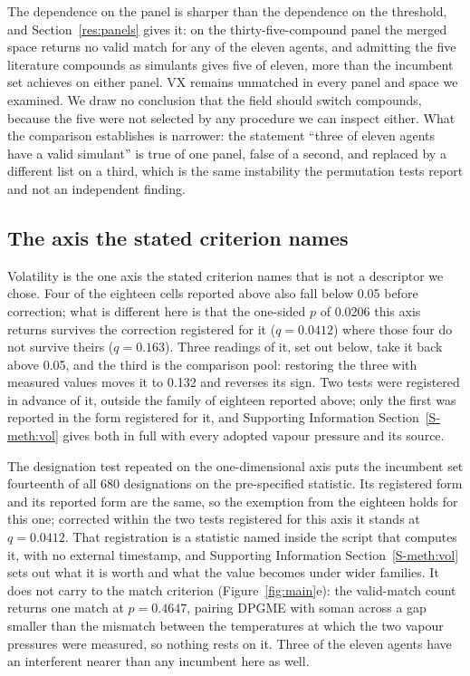 \documentclass[journal=ancham,manuscript=article,margin=1in]{achemso}
\begin{document}
The dependence on the panel is sharper than the dependence on the threshold, and
Section~\ref{res:panels} gives it: on the thirty-five-compound panel the merged
space returns no valid match for any of the eleven agents, and admitting the
five literature compounds as simulants gives five of eleven, more than the
incumbent set achieves on either panel. VX remains unmatched in every panel and
space we examined. We draw no conclusion that the field should switch compounds,
because the five were not selected by any procedure we can inspect either. What
the comparison establishes is narrower: the statement ``three of eleven agents
have a valid simulant'' is true of one panel, false of a second, and replaced by
a different list on a third, which is the same instability the permutation tests
report and not an independent finding.

\subsection{The axis the stated criterion names}
\label{res:vol}
Volatility is the one axis the stated criterion names that is not a descriptor
we chose. Four of the eighteen cells reported above also fall below 0.05 before
correction; what is different here is that the one-sided $p$ of 0.0206 this
axis returns survives the correction registered for it ($q = 0.0412$) where
those four do not survive theirs ($q = 0.163$). Three readings of it,
set out below, take it back above 0.05, and the third is the comparison pool:
restoring the three with measured values moves it to 0.132 and reverses
its sign. Two tests were registered in advance of it,
outside the family of eighteen reported above; only the first was reported in
the form registered for it, and Supporting Information
Section~\ref{S-meth:vol} gives both in full with every adopted vapour pressure
and its source.

The designation test repeated on the one-dimensional axis puts the incumbent set
fourteenth of all 680 designations on the pre-specified statistic. Its registered form and its reported form are the same, so the
exemption from the eighteen holds for this one; corrected within the two tests
registered for this axis it stands at $q = 0.0412$. That registration is a
statistic named inside the script that computes it, with no external timestamp,
and Supporting Information Section~\ref{S-meth:vol} sets out what it is worth
and what the value becomes under wider families. It does not carry to the match criterion
(Figure~\ref{fig:main}e): the valid-match count returns one match at
$p = 0.4647$, pairing DPGME with soman across a gap smaller than the mismatch between the temperatures
at which the two vapour pressures were measured, so nothing rests on it. Three
of the eleven agents have an interferent nearer than any incumbent here as
well.
\end{document}

